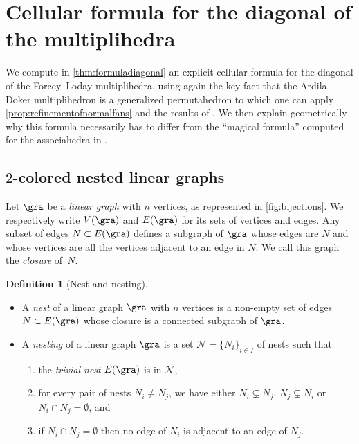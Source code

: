 \documentclass[JEP,XML,SOM,NoFloatCountersInSection,Unicode,published]{cedram}
\theoremstyle{definition}
\newtheorem{definition}{Definition}[section]
\theoremstyle{plain}
\begin{document}
\section{Cellular formula for the diagonal of the multiplihedra} \label{sec:III}

We compute in \cref{thm:formuladiagonal} an explicit cellular formula for the diagonal of the Forcey--Loday multiplihedra, using again the key fact that the Ardila--Doker multiplihedron is a generalized permutahedron to which one can apply \cref{prop:refinementofnormalfans} and the results of \cite{LA21}. We then explain geometrically why this formula necessarily has to differ from the ``magical formula'' computed for the associahedra in \cite{MTTV19}.

\subsection{$2$-colored nested linear graphs} \label{ss:2-col}

Let $\gra$ be a \emph{linear graph} with $n$ vertices, as represented in \cref{fig:bijections}.
We respectively write $V(\gra)$ and $E(\gra)$ for its sets of vertices and edges.
Any subset of edges $N\subset E(\gra)$ defines a subgraph of $\gra$ whose edges are $N$ and whose vertices are all the vertices adjacent to an edge in $N$.
We call this graph the \emph{closure} of~$N$.

\pagebreak[2]
\skpt
\begin{definition}[Nest and nesting]\label{def:nest}
\begin{itemize}
\item A \emph{nest} of a linear graph $\gra$ with $n$ vertices is a non-empty set of edges $N \subset E(\gra)$ whose closure is a connected subgraph of $\gra$.
\item A \emph{nesting} of a linear graph $\gra$ is a set $\mathcal{N}=\{N_i\}_{i\in I}$ of nests such that
\begin{enumerate}
\item\label{def:nest1} the \emph{trivial nest} $E(\gra)$ is in $\mathcal{N}$,
\item\label{def:nest2} for every pair of nests $N_i\neq N_j$, we have either $N_i \subsetneq N_j$, $N_j \subsetneq N_i$ or $N_i \cap N_j = \emptyset$, and
\item\label{def:nest3} if $N_i \cap N_j = \emptyset$ then no edge of $N_i$ is adjacent to an edge of $N_j$.
\end{enumerate}
\end{itemize}
\end{definition}
\end{document}
